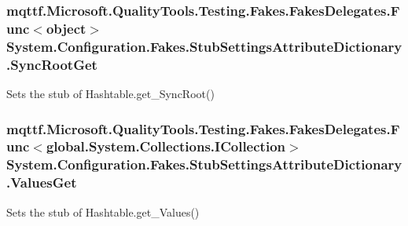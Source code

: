 \hypertarget{class_system_1_1_configuration_1_1_fakes_1_1_stub_settings_attribute_dictionary_ae451c57929ecd6cf14a4271d44c12915}{
\subsubsection[{Sync\-Root\-Get}]{\setlength{\rightskip}{0pt plus 5cm}mqttf.\-Microsoft.\-Quality\-Tools.\-Testing.\-Fakes.\-Fakes\-Delegates.\-Func$<$object$>$ System.\-Configuration.\-Fakes.\-Stub\-Settings\-Attribute\-Dictionary.\-Sync\-Root\-Get}}\label{class_system_1_1_configuration_1_1_fakes_1_1_stub_settings_attribute_dictionary_ae451c57929ecd6cf14a4271d44c12915}


Sets the stub of Hashtable.\-get\-\_\-\-Sync\-Root()

\hypertarget{class_system_1_1_configuration_1_1_fakes_1_1_stub_settings_attribute_dictionary_aaaba3fdbfa2116c187f114287ab49e37}{
\subsubsection[{Values\-Get}]{\setlength{\rightskip}{0pt plus 5cm}mqttf.\-Microsoft.\-Quality\-Tools.\-Testing.\-Fakes.\-Fakes\-Delegates.\-Func$<$global.\-System.\-Collections.\-I\-Collection$>$ System.\-Configuration.\-Fakes.\-Stub\-Settings\-Attribute\-Dictionary.\-Values\-Get}}\label{class_system_1_1_configuration_1_1_fakes_1_1_stub_settings_attribute_dictionary_aaaba3fdbfa2116c187f114287ab49e37}


Sets the stub of Hashtable.\-get\-\_\-\-Values()



